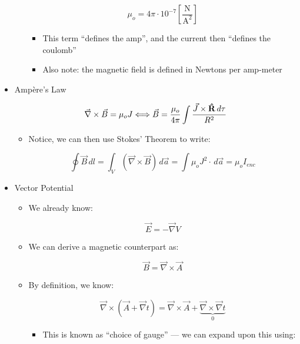 \begin{itemize}
\begin{itemize}
        $$\mu_o=4\pi\cdot10^{-7}\left[ \frac{\si{\newton}}{\si{\ampere\squared}} \right]$$

        \begin{itemize}

          \item This term ``defines the amp'', and the current then ``defines the coulomb''

          \item Also note: the magnetic field is defined in Newtons per amp-meter

        \end{itemize}

    \end{itemize}

  \item Amp\`ere's Law

    $$\vec{\nabla}\times\vec{B}=\mu_oJ\Longleftrightarrow\vec{B}=\frac{\mu_o}{4\pi}\int\frac{\vec{J}\times\bold{\hat{R}}\,d\tau}{R^2}$$

    \begin{itemize}

      \item Notice, we can then use Stokes' Theorem to write:

        $$\oint\vec{B}\,dl=\int_V (\vec{\nabla}\times\vec{B})\,d\vec{a}=\int\mu_oJ^2\cdot\,d\vec{a}=\mu_oI_{enc}$$

    \end{itemize}

  \item Vector Potential

    \begin{itemize}

      \item We already know:

        $$\vec{E}=-\vec{\nabla}V$$

      \item We can derive a magnetic counterpart as:

        $$\vec{B}=\vec{\nabla}\times\vec{A}$$

      \item By definition, we know:

        $$\vec{\nabla}\times(\vec{A}+\vec{\nabla}t)=\vec{\nabla}\times\vec{A}+\underbrace{\vec{\nabla}\times\vec{\nabla}t}_{0}$$

        \begin{itemize}

          \item This is known as ``choice of gauge'' — we can expand upon this using:


\end{itemize}
\end{itemize}
\end{itemize}

